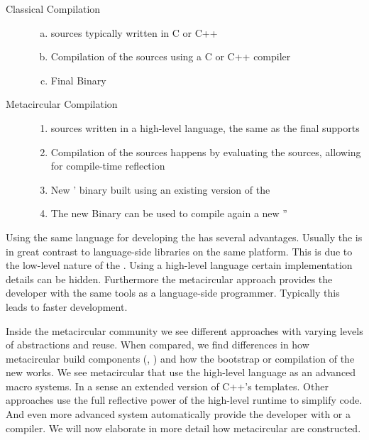 \begin{description}
\item[Classical \VM Compilation] \hfill
	\begin{enumerate}[a), nolistsep]
		\item \VM sources typically written in C or C++
		\item Compilation of the \VM sources using a C or C++ compiler
		\item Final Binary
	\end{enumerate}

\item[Metacircular \VM Compilation] \hfill
	\begin{enumerate}[nolistsep]
		\item \VM sources written in a high-level language, the same as the final \VM supports
		\item Compilation of the \VM sources happens by evaluating the \VM sources, allowing for compile-time reflection
		\item New \VM' binary built using an existing version of the \VM
		\item The new \VM Binary can be used to compile again a new \VM''
	\end{enumerate}
\end{description}

\noindent Using the same language for developing the \VM has several advantages.
Usually the \VM is in great contrast to language-side libraries on the same platform.
This is due to the low-level nature of the \VM.
Using a high-level language certain implementation details can be hidden.
Furthermore the metacircular approach provides the \VM developer with the same tools as a language-side programmer.
Typically this leads to faster development.


Inside the metacircular \VM community we see different approaches with varying levels of abstractions and reuse.
When compared, we find differences in how metacircular \VMs build \VM components (\GC, \JIT) and how the bootstrap or compilation of the new \VM works.
We see metacircular \VMs that use the high-level language as an advanced macro systems.
In a sense an extended version of C++'s templates.
Other approaches use the full reflective power of the high-level runtime to simplify code.
And even more advanced system automatically provide the \VM developer with \GC or a \JIT compiler.
We will now elaborate in more detail how metacircular \VMs are constructed.


